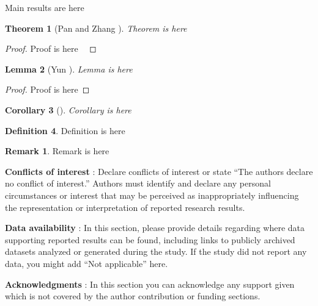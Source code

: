 \documentclass[10pt,twoside,reqno]{amsart} %
\theoremstyle{plain}
\newtheorem{thm}{Theorem}[section]
\newtheorem{lem}[thm]{Lemma}
\newtheorem{cor}[thm]{Corollary}
\theoremstyle{definition}
\newtheorem{defn}[thm]{Definition}
\newtheorem{rem}{Remark}[section]
\begin{document}
Main results are here

\begin{thm}[Pan and Zhang {\cite[p. 682 (1.5)]{bc}}]
Theorem is here
\end{thm}
\begin{proof}
Proof is here ~\cite[Proposition 1.4]{cp}
\end{proof}

\begin{lem}[Yun \cite{pang}]
Lemma is here
\end{lem}
\begin{proof}
Proof is here
\end{proof}

\begin{cor}[\cite{pang}]
Corollary is here
\end{cor}

\begin{defn}
Definition is here
\end{defn}

\begin{rem}
Remark is here
\end{rem}


\bigskip
{\bf Conflicts of interest} : {Declare conflicts of interest or state ``The authors declare no conflict of interest.'' Authors must identify and declare any personal circumstances or interest that may be perceived as inappropriately influencing the representation or interpretation of reported research results.} 

\bigskip
{\bf Data availability} : {In this section, please provide details regarding where data supporting reported results can be found, including links to publicly archived datasets analyzed or generated during the study. If the study did not report any data, you might add ``Not applicable'' here.} 

\bigskip
{\bf Acknowledgments} : {In this section you can acknowledge any support given which is not covered by the author contribution or funding sections.}
\end{document}
